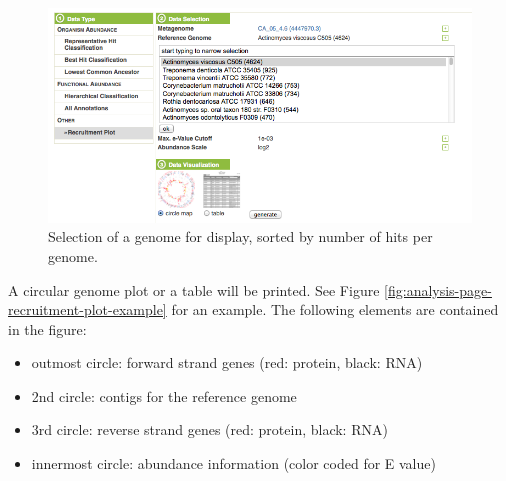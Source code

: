 \documentclass[12pt,fullpage]{report}
\begin{document}
\begin{figure}
\begin{center}
\includegraphics[width=6in]{Images/analysis-page-recruitment-plot-genome-selection.png}
\end{center}
\caption{
Selection of a genome for display, sorted by number of hits per genome.
}
\label{fig:analysis-page-recruitment-plot-genome-selection}
\end{figure}

A circular genome plot or a table will be printed. See Figure \ref{fig:analysis-page-recruitment-plot-example}
for an example. The following elements are contained in the figure:

\begin{itemize}
\item outmost circle: forward strand genes (red: protein, black: RNA)
\item 2nd circle: contigs for the reference genome
\item 3rd circle: reverse strand genes (red: protein, black: RNA)
\item innermost circle: abundance information (color coded for E value)
\end{itemize}
\end{document}
